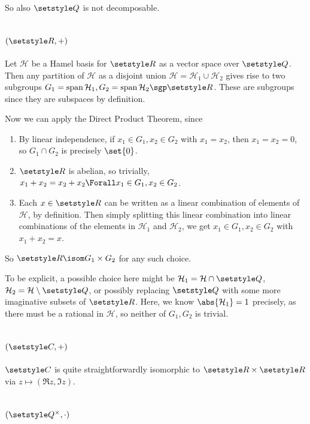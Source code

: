 \documentclass[fleqn,a4paper,11pt]{article}
\begin{document}
So also \(\Rationals\) is not decomposable.

\section{\((\Reals, +)\)}

Let \(\mathcal H\) be a Hamel basis for \(\Reals\) as a vector space over
\(\Rationals\). Then any partition of \(\mathcal H\) as a disjoint union
\(\mathcal H = \mathcal H_1 \cup \mathcal H_2\) gives rise to two subgroups
\(G_1 = \vspan \mathcal H_1, G_2 = \vspan \mathcal H_2 \sgp \Reals\). These are
subgroups since they are subspaces by definition.

Now we can apply the Direct Product Theorem, since
\begin{enumerate}[label=(\roman*)]
 \item
  By linear independence, if \(x_1 \in G_1, x_2 \in G_2\) with \(x_1 = x_2\),
  then \(x_1 = x_2 = 0\), so \(G_1 \cap G_2\) is precisely \(\set{0}\).
 \item
  \(\Reals\) is abelian, so trivially,
  \(x_1 + x_2 = x_2 + x_2 \Forall x_1 \in G_1, x_2 \in G_2\).
 \item
  Each \(x \in \Reals\) can be written as a linear combination of elements of
  \(\mathcal H\), by definition. Then simply splitting this linear combination
  into linear combinations of the elements in \(\mathcal H_1\) and
  \(\mathcal H_2\), we get \(x_1 \in G_1, x_2 \in G_2\) with \(x_1 + x_2 = x\).
\end{enumerate}
So \(\Reals \isom G_1 \times G_2\) for any such choice.

To be explicit, a possible choice here might be
\(\mathcal H_1 = \mathcal H \cap \Rationals\),
\(\mathcal H_2 = \mathcal H \setminus \Rationals\), or possibly replacing
\(\Rationals\) with some more imaginative subsets of \(\Reals\). Here, we know
\(\abs{\mathcal H_1} = 1\) precisely, as there must be a rational in
\(\mathcal H\), so neither of \(G_1, G_2\) is trivial.

\section{\((\Complex, +)\)}

\(\Complex\) is quite straightforwardly isomorphic to \(\Reals \times \Reals\)
via \(z \mapsto (\Re z, \Im z)\).

\section{\((\Rationals^\times, \cdot)\)}
\end{document}
